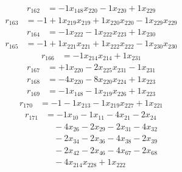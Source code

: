 \[\begin{aligned}
r_{162} &= - 1 x_{148} x_{220} - 1 x_{220} + 1 x_{229}
\end{aligned}\]
\[\begin{aligned}
r_{163} &= - 1 + 1 x_{219} x_{219} + 1 x_{220} x_{220} - 1 x_{229} x_{229}
\end{aligned}\]
\[\begin{aligned}
r_{164} &= - 1 x_{222} - 1 x_{222} x_{223} + 1 x_{230}
\end{aligned}\]
\[\begin{aligned}
r_{165} &= - 1 + 1 x_{221} x_{221} + 1 x_{222} x_{222} - 1 x_{230} x_{230}
\end{aligned}\]
\[\begin{aligned}
r_{166} &= - 1 x_{214} x_{214} + 1 x_{231}
\end{aligned}\]
\[\begin{aligned}
r_{167} &= + 1 x_{220} - 2 x_{225} x_{231} - 1 x_{231}
\end{aligned}\]
\[\begin{aligned}
r_{168} &= - 4 x_{220} - 8 x_{220} x_{224} + 1 x_{223}
\end{aligned}\]
\[\begin{aligned}
r_{169} &= - 1 x_{148} - 1 x_{219} x_{226} + 1 x_{223}
\end{aligned}\]
\[\begin{aligned}
r_{170} &= - 1 - 1 x_{213} - 1 x_{219} x_{227} + 1 x_{221}
\end{aligned}\]
\[\begin{aligned}
r_{171} &= - 1 x_{10} - 1 x_{11} - 4 x_{21} - 2 x_{24} \\
 &\quad - 4 x_{26} - 2 x_{29} - 2 x_{31} - 4 x_{32} \\
 &\quad - 2 x_{34} - 2 x_{36} - 4 x_{38} - 2 x_{39} \\
 &\quad - 2 x_{42} - 2 x_{46} - 4 x_{67} - 2 x_{68} \\
 &\quad - 4 x_{214} x_{228} + 1 x_{222}
\end{aligned}\]
